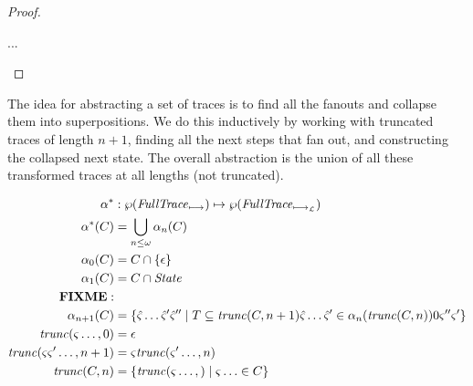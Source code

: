 \documentclass{llncs}
\begin{document}
{\begin{proof}
\begin{byCases}
{\begin{byCases}
{        ...}



  \end{byCases}
 }
\end{byCases}
\end{proof}

The idea for abstracting a set of traces is to find all the fanouts
and collapse them into superpositions. We do this inductively by
working with truncated traces of length $n+1$, finding all the next
steps that fan out, and constructing the collapsed next state. The
overall abstraction is the union of all these transformed traces at
all lengths (not truncated).

\begin{align*}
\alpha^* &: \wp(\mathit{FullTrace}_{\mathbin{\longmapsto}}) \mapsto \wp(\mathit{FullTrace}_{\mathbin{\longmapsto_{{\mathcal L}}}}) \\
\alpha^*(C) &= \bigcup\limits_{n \le \omega}\alpha_n(C) \\
\alpha_0(C) &= C \cap \{\epsilon\} \\
\alpha_1(C) &= C \cap \mathit{State} \\
\mathbf{FIXME:} &\\
\alpha_{n+1}(C) &= \{\hat{\varsigma}\ldots\hat{\varsigma}'\hat{\varsigma}'' \mid
                         T \subseteq \mathit{trunc}(C,n+1)
                         \hat{\varsigma}\ldots\hat{\varsigma}' \in \alpha_{n}(\mathit{trunc}(C,n)) 0
                         \varsigma'' \varsigma'\} \\
\mathit{trunc}(\varsigma\ldots,0) &= \epsilon \\
\mathit{trunc}(\varsigma\varsigma'\ldots,n+1) &= \varsigma\mathit{trunc}(\varsigma'\ldots,n) \\
\mathit{trunc}(C,n) &= \{\mathit{trunc}(\varsigma\ldots,) \mid \varsigma\ldots \in C\}
\end{align*}

}
\end{document}
